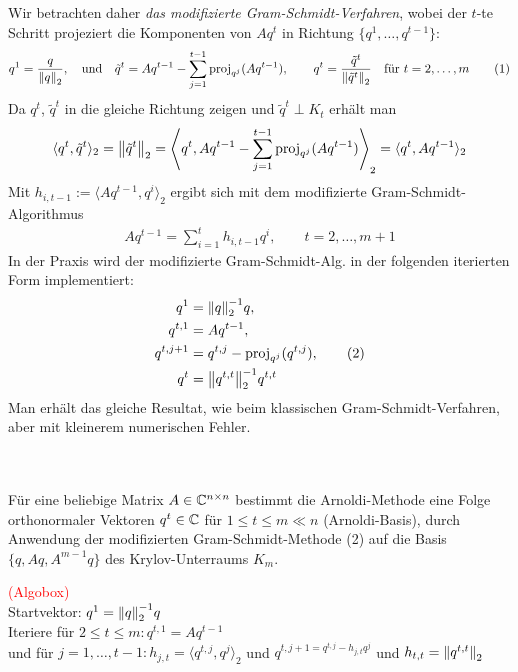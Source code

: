 Wir betrachten daher \textit{das modifizierte Gram-Schmidt-Verfahren}, wobei der $t$-te Schritt projeziert die Komponenten
von $Aq^t$ in Richtung $\{q^1,\dotsc,q^{t-1}\}$:
\begin{align*}q^{1} = \dfrac{q}{\vertn{2}{q}_2},\quad\text{und}\quad\tilde{q}^{t} = Aq^{t-1} - \sum_{j=1}^{t-1} \text{proj}_{q^j}(Aq^{t-1}), 
\qquad q^t = \dfrac{\tilde{q}^t}{\vertn{2}{\tilde{q}^t}_2}\quad\text{für } t=2,\dotsc,m \tag{1}\end{align*}
Da $q^t$, $\tilde{q}^t$ in die gleiche Richtung zeigen und $\tilde{q}^t\perp K_t$ erhält man 
\begin{align*}\langle q^t, \tilde{q}^t\rangle_2 = \vertn{2}{\tilde{q}^t}_2 = 
\left\langle q^t,Aq^{t-1} - \sum_{j=1}^{t-1} \text{proj}_{q^j}(Aq^{t-1})\right\rangle_2 = \langle q^t, Aq^{t-1}\rangle_2\end{align*}
Mit $h_{i,t-1} := \langle Aq^{t-1},q^i \rangle_2$ ergibt sich mit dem modifizierte Gram-Schmidt-Algorithmus
\begin{align*}Aq^{t-1}=\sum_{i=1}^{t} h_{i,t-1 }q^i, \qquad t=2,\dotsc,m+1\end{align*}
In der Praxis wird der modifizierte Gram-Schmidt-Alg. in der folgenden iterierten Form implementiert:
\begin{align*}
  q^1 &= \vertn{2}{q}_2^{-1}q, \\
  q^{t,1}&=Aq^{t-1}, \\
  q^{t,j+1}&=q^{t,j}-\text{proj}_{q^j}(q^{t,j}), \tag{2}\\
  q^t&=\vertn{2}{q^{t,t}}_2^{-1}q^{t,t}
\end{align*}
Man erhält das gleiche Resultat, wie beim klassischen Gram-Schmidt-Verfahren, aber mit kleinerem numerischen Fehler. \\ \\
\begin{defbox} \ \\
  Für eine beliebige Matrix $A\in\mathbb C  ^{n\times n}$ bestimmt die Arnoldi-Methode eine Folge orthonormaler 
  Vektoren $q^t\in\mathbb C  $ für $1\leq t \leq m \ll n$ (Arnoldi-Basis), durch Anwendung der modifizierten 
  Gram-Schmidt-Methode (2) auf die Basis $\{q,Aq,A^{m-1}q\}$ des Krylov-Unterraums $K_m$.
\end{defbox}
\textcolor{red}{(Algobox)} \\
Startvektor: $q^1=\vertn{2}{q}^{-1}_2 q$ \\
Iteriere für $2\leq t\leq m: q^{t,1}=Aq^{t-1}$ \\
und für $j=1,\dotsc,t-1: h_{j,t} = \langle q^{t,j},q^j\rangle_2$ und $q^{t,j+1=q^{t,j}-h_{j,t}q^j}$ und $h_{t,t}=\vertn{2}{q^{t,t}}_2$ 

